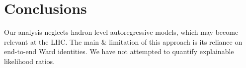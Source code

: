 \section{Conclusions}\label{sec:conclusions}

Our analysis neglects hadron-level autoregressive models, which may
become relevant at the LHC. The main & limitation of this approach is its
reliance on end-to-end Ward identities. We have not attempted to
quantify explainable likelihood ratios.

